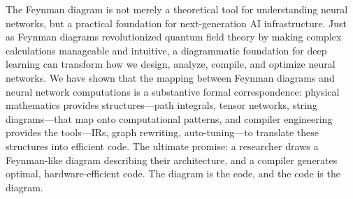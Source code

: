 \documentclass[12pt,a4paper]{article}
\begin{document}
The Feynman diagram is not merely a theoretical tool for understanding neural networks, but a practical foundation for next-generation AI infrastructure. Just as Feynman diagrams revolutionized quantum field theory by making complex calculations manageable and intuitive, a diagrammatic foundation for deep learning can transform how we design, analyze, compile, and optimize neural networks. We have shown that the mapping between Feynman diagrams and neural network computations is a substantive formal correspondence: physical mathematics provides structures---path integrals, tensor networks, string diagrams---that map onto computational patterns, and compiler engineering provides the tools---IRs, graph rewriting, auto-tuning---to translate these structures into efficient code. The ultimate promise: a researcher draws a Feynman-like diagram describing their architecture, and a compiler generates optimal, hardware-efficient code. The diagram is the code, and the code is the diagram.

\printbibliography
\end{document}
